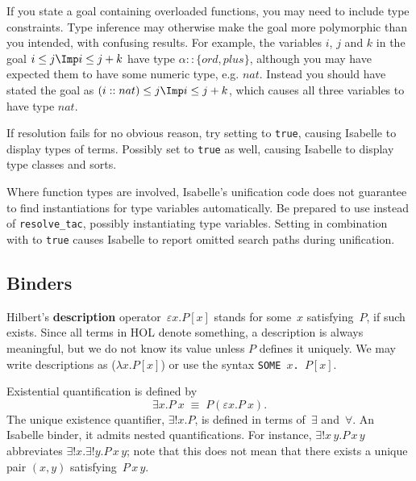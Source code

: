 If you state a goal containing overloaded functions, you may need to include
type constraints.  Type inference may otherwise make the goal more
polymorphic than you intended, with confusing results.  For example, the
variables $i$, $j$ and $k$ in the goal $i \leq j \Imp i \leq j+k$ have type
$\alpha::\{ord,plus\}$, although you may have expected them to have some
numeric type, e.g. $nat$.  Instead you should have stated the goal as
$(i::nat) \leq j \Imp i \leq j+k$, which causes all three variables to have
type $nat$.

\begin{warn}
  If resolution fails for no obvious reason, try setting
   to \texttt{true}, causing Isabelle to display
  types of terms.  Possibly set  to \texttt{true} as
  well, causing Isabelle to display type classes and sorts.

  Where function types are involved, Isabelle's unification code does not
  guarantee to find instantiations for type variables automatically.  Be
  prepared to use  instead of \texttt{resolve_tac},
  possibly instantiating type variables.  Setting 
  in combination with  to \texttt{true} causes
  Isabelle to report omitted search paths during unification.
\end{warn}


\subsection{Binders}

Hilbert's {\bf description} operator~$\varepsilon x. P[x]$ stands for some~$x$
satisfying~$P$, if such exists.  Since all terms in HOL denote something, a
description is always meaningful, but we do not know its value unless $P$
defines it uniquely.  We may write descriptions as ($\lambda x.
P[x]$) or use the syntax \hbox{\tt SOME~$x$.~$P[x]$}.

Existential quantification is defined by
\[ \exists x. P~x \;\equiv\; P(\varepsilon x. P~x). \]
The unique existence quantifier, $\exists!x. P$, is defined in terms
of~$\exists$ and~$\forall$.  An Isabelle binder, it admits nested
quantifications.  For instance, $\exists!x\,y. P\,x\,y$ abbreviates
$\exists!x. \exists!y. P\,x\,y$; note that this does not mean that there
exists a unique pair $(x,y)$ satisfying~$P\,x\,y$.

